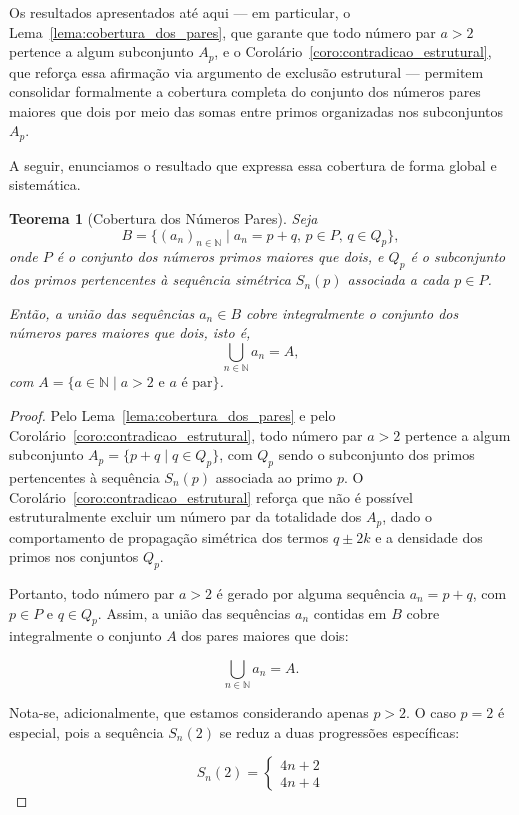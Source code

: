 \documentclass[a4paper,11pt]{article}
\newtheorem{theorem}{Teorema}[section]
\theoremstyle{definition}
\theoremstyle{remark}
\begin{document}
\begin{otherlanguage}{brazil}
	Os resultados apresentados até aqui — em particular, o Lema~\ref{lema:cobertura_dos_pares}, que garante que todo número par \( a > 2 \) pertence a algum subconjunto \( A_p \), e o Corolário~\ref{coro:contradicao_estrutural}, que reforça essa afirmação via argumento de exclusão estrutural — permitem consolidar formalmente a cobertura completa do conjunto dos números pares maiores que dois por meio das somas entre primos organizadas nos subconjuntos \( A_p \).
	
	A seguir, enunciamos o resultado que expressa essa cobertura de forma global e sistemática.
	
	\begin{theorem}[Cobertura dos Números Pares]\label{teo:cobertura_dos_pares}
		Seja
		\[
		B = \{(a_n)_{n \in \mathbb{N}} \mid a_n = p + q,\, p \in P,\, q \in Q_p\},
		\]
		onde \(P\) é o conjunto dos números primos maiores que dois, e \(Q_p\) é o subconjunto dos primos pertencentes à sequência simétrica \(S_n(p)\) associada a cada \(p \in P\).
		
		Então, a união das sequências \(a_n\in B\) cobre integralmente o conjunto dos números pares maiores que dois, isto é,
		\[
		\bigcup_{n \in \mathbb{N}} a_n = A,
		\]
		com \(A = \{a \in \mathbb{N} \mid a > 2 \text{ e } a \text{ é par} \}\).
	\end{theorem}
	\begin{proof}
		Pelo Lema~\ref{lema:cobertura_dos_pares} e pelo Corolário~\ref{coro:contradicao_estrutural}, todo número par \(a > 2\) pertence a algum subconjunto \(A_p = \{p + q \mid q \in Q_p\}\), com \(Q_p\) sendo o subconjunto dos primos pertencentes à sequência \(S_n(p)\) associada ao primo \(p\). O Corolário~\ref{coro:contradicao_estrutural} reforça que não é possível estruturalmente excluir um número par da totalidade dos \(A_p\), dado o comportamento de propagação simétrica dos termos \(q \pm 2k\) e a densidade dos primos nos conjuntos \(Q_p\).
		
		Portanto, todo número par \(a > 2\) é gerado por alguma sequência \(a_n = p + q\), com \(p \in P\) e \(q \in Q_p\). Assim, a união das sequências \(a_n\) contidas em \(B\) cobre integralmente o conjunto \(A\) dos pares maiores que dois:
		
		\[
		\bigcup_{n \in \mathbb{N}} a_n = A.
		\]
		
			Nota-se, adicionalmente, que estamos considerando apenas \(p > 2\). O caso \(p = 2\) é especial, pois a sequência \(S_n(2)\) se reduz a duas progressões específicas:
		
		\[
		S_n(2) =
		\begin{cases}
			4n + 2 \\
			4n + 4
		\end{cases}
		\]
		

\end{proof}
\end{otherlanguage}
\end{document}
